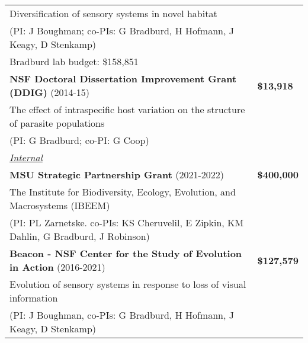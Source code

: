\documentclass{gbcv}
\begin{document}
\begin{longtable}{>{\everypar{\dohang}\dohang\raggedright\arraybackslash}p{}p{}}
\hspace{4.5mm}Diversification of sensory systems in novel habitat\\
\hspace{4.5mm}(PI: J Boughman; co-PIs: G Bradburd, H Hofmann, J Keagy, D Stenkamp)\\ 
\hspace{4.5mm}Bradburd lab budget: \$158,851 \\
\vspace{-0.1cm}
%
\textbf{NSF Doctoral Dissertation Improvement Grant (DDIG)} (2014-15) & \hfill \textbf{\$13,918}\\
\hspace{4.5mm}The effect of intraspecific host variation on the structure of parasite populations\\
\hspace{4.5mm}(PI: G Bradburd; co-PI: G Coop)\\ \vspace{-0.1cm}

\textit{\underline{Internal}}\\
\textbf{MSU Strategic Partnership Grant} (2021-2022) & \hfill \textbf{\$400,000}\\
\hspace{4.5mm}The Institute for Biodiversity, Ecology, Evolution, and Macrosystems (IBEEM)\\
\hspace{4.5mm}(PI: PL Zarnetske. co-PIs: KS Cheruvelil, E Zipkin, KM Dahlin, G Bradburd, J Robinson)\\ \vspace{-0.1cm}

\textbf{Beacon - NSF Center for the Study of Evolution in Action} (2016-2021) & \hfill \textbf{\$127,579}\\
\hspace{4.5mm}Evolution of sensory systems in response to loss of visual information\\
\hspace{4.5mm}(PI: J Boughman, co-PIs: G Bradburd, H Hofmann, J Keagy, D Stenkamp)\\
%
\end{longtable}
\vspace{-0.3cm}
\end{document}
